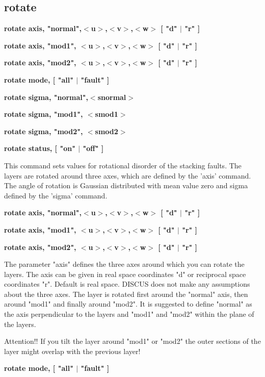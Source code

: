 \subsection*{rotate}
{\bf rotate axis,  "normal",$ <$u$> $,$ <$v$> $,$ <$w$> $ [ "d" $| $ "r" ] \par }
{\bf rotate axis,  "mod1",  $ <$u$> $,$ <$v$> $,$ <$w$> $ [ "d" $| $ "r" ] \par }
{\bf rotate axis,  "mod2",  $ <$u$> $,$ <$v$> $,$ <$w$> $ [ "d" $| $ "r" ] \par }
{\bf rotate mode, [ "all" $| $ "fault" ] \par }
{\bf rotate sigma, "normal",$ <$snormal$> $ \par }
{\bf rotate sigma, "mod1",  $ <$smod1$> $ \par }
{\bf rotate sigma, "mod2",  $ <$smod2$> $ \par }
{\bf rotate status,  [ "on" $| $ "off" ] \par }
\par
\vspace{3pt}
This command sets values for rotational disorder of the stacking faults. 
The layers are rotated around three axes, which are defined by the 
'axis' command. The angle of rotation is Gaussian distributed with mean 
value zero and sigma defined by the 'sigma' command. 
\par
{\bf rotate axis,  "normal",$ <$u$> $,$ <$v$> $,$ <$w$> $ [ "d" $| $ "r" ] \par }
{\bf rotate axis,  "mod1",  $ <$u$> $,$ <$v$> $,$ <$w$> $ [ "d" $| $ "r" ] \par }
{\bf rotate axis,  "mod2",  $ <$u$> $,$ <$v$> $,$ <$w$> $ [ "d" $| $ "r" ] \par }
\par
\vspace{3pt}
The parameter "axis" defines the three axes around which you can rotate 
the layers. The axis can be given in real space coordinates "d" or 
reciprocal space coordinates "r". Default is real space. 
DISCUS does not make any assumptions about the three axes. The layer 
is rotated first around the "normal" axis, then around "mod1" and finally 
around "mod2". It is suggested to define "normal" as the axis perpendicular 
to the layers and "mod1" and "mod2" within the plane of the layers. 
\par
Attention!! 
If you tilt the layer around "mod1" or "mod2" the outer sections of the 
layer might overlap with the previous layer! 
\par
{\bf rotate mode, [ "all" $| $ "fault" ] \par }

